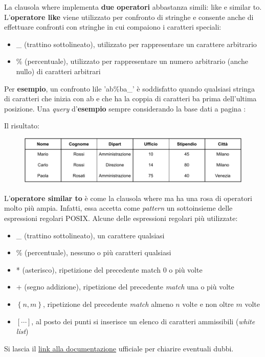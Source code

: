 \documentclass[a4paper]{article}
\begin{document}
	La clausola \textsf{where} implementa \textbf{due operatori} abbastanza simili: \textsf{like} e \textsf{similar to}. L'\textbf{operatore \textsf{like}} viene utilizzato per confronto di stringhe e consente anche di effettuare confronti con stringhe in cui compaiono i caratteri speciali:
	\begin{itemize}
		\item \_ (trattino sottolineato), utilizzato per rappresentare un carattere arbitrario
		\item \% (percentuale), utilizzato per rappresentare un numero arbitrario (anche nullo) di caratteri arbitrari
	\end{itemize}
	Per \textcolor{Green4}{\textbf{esempio}}, un confronto \textsf{lile 'ab\%ba\_'} è soddisfatto quando qualsiasi stringa di caratteri che inizia con \textsf{ab} e che ha la coppia di caratteri \textsf{ba} prima dell'ultima posizione. Una \emph{query} d'\textcolor{Green4}{\textbf{esempio}} sempre considerando la base dati a pagina \pageref{select dbms}:
	
	Il risultato:
	\begin{figure}[!htp]
		\centering
		\includegraphics[width=\textwidth]{img/where-ex4.pdf}
	\end{figure}\:\newline

	\noindent
	L'\textbf{operatore \textsf{similar to}} è come la clausola \textsf{where} ma ha una rosa di operatori molto più ampia. Infatti, essa accetta come \emph{pattern} un sottoinsieme delle espressioni regolari POSIX. Alcune delle espressioni regolari più utilizzate:
	\begin{itemize}
		\item \_ (trattino sottolineato), un carattere qualsiasi
		\item \% (percentuale), nessuno o più caratteri qualsiasi
		\item * (asterisco), ripetizione del precedente match $0$ o più volte
		\item + (segno addizione), ripetizione del precedente \emph{match} una o più volte
		\item $\left\{n,m\right\}$, ripetizione del precedente \emph{match} almeno $n$ volte e non oltre $m$ volte
		\item $\left[\cdots\right]$, al posto dei punti si inserisce un elenco di caratteri ammissibili (\emph{white list})
	\end{itemize}
	Si lascia il \href{https://www.postgresql.org/docs/current/functions-matching.html#FUNCTIONS-SIMILARTO-REGEXP}{link alla documentazione} ufficiale per chiarire eventuali dubbi.\newpage
	
\end{document}
